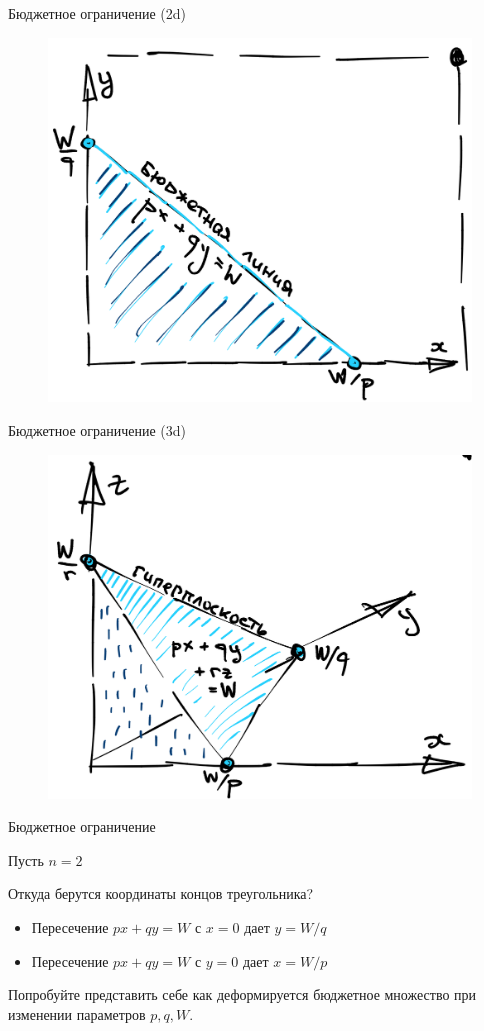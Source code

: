 \documentclass{beamer}
\begin{document}
\begin{frame}{Бюджетное ограничение (2d)}

\begin{figure}[hbt]
\centering
\includegraphics[width=.8 \textwidth]{budget_2d.png}
\end{figure}

\end{frame}

\begin{frame}{Бюджетное ограничение (3d)}

\begin{figure}[hbt]
\centering
\includegraphics[width=.8 \textwidth]{budget_3d.png}
\end{figure}

\end{frame}

\begin{frame}{Бюджетное ограничение}

Пусть $n = 2$

Откуда берутся координаты концов треугольника?

\begin{itemize}
  \item Пересечение $p x + q y = W$ с $x=0$ дает $y = W/q$
  \item Пересечение $p x + q y = W$ с $y=0$ дает $x = W/p$
\end{itemize}

Попробуйте представить себе как деформируется бюджетное множество при изменении параметров $p,q,W$.

\end{frame}
\end{document}
